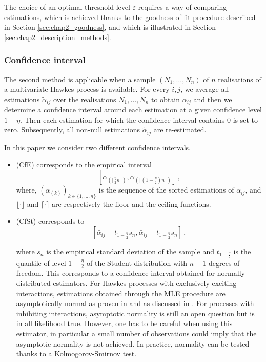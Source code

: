    The choice of an optimal threshold level $\varepsilon$ requires a way of comparing estimations, which is achieved thanks to the goodness-of-fit procedure described in Section \ref{sec:chap2_goodness},
   and which is illustrated in Section \ref{sec:chap2_description_methods}.
   
   \subsubsection{Confidence interval}\label{sec:chap2_confidence_interval}
   
   The second method is applicable when a sample $(N_1, \ldots, N_n)$ of $n$ realisations of a multivariate Hawkes process is available. For every $i,j$, we average all estimations $\tilde\alpha_{ij}$ over the realisations $N_1, \ldots, N_n$ to obtain $\bar\alpha_{ij}$ and then we determine a confidence interval around each estimation at a given confidence level $1-\eta$. Then each estimation for which the confidence interval contains $0$ is set to zero. Subsequently, all non-null estimations $\tilde\alpha_{ij}$ are re-estimated.
   
   In this paper we consider two different confidence intervals. 
   \begin{itemize}
   \item (CfE) corresponds to the empirical interval
   \[
      \left[\alpha_{(\lfloor{\frac{\eta}{2} n}\rfloor)}, \alpha_{(\lceil (1-\frac{\eta}{2}) n \rceil)}\right]\,,
    \]
    where, $(\alpha_{(k)})_{k\in \{1, \ldots, n\}}$ is the sequence of the sorted estimations of $\alpha_{ij}$,
    and $\lfloor \cdot \rfloor$ and $\lceil \cdot \rceil$ are respectively the floor and the ceiling functions.
   \item (CfSt) corresponds to
   \[\left[\bar\alpha_{ij} - t_{1-\frac{\eta}{2}} s_n, \bar\alpha_{ij} + t_{1-\frac{\eta}{2}} s_n \right]\,,\]

   where $s_n$ is the empirical standard deviation of the sample and $t_{1-\frac{\eta}{2}}$ is the quantile of level $1-\frac{\eta}{2}$ of the Student distribution with $n-1$ degrees of freedom. 
   This corresponds to a confidence interval obtained for normally distributed estimators.
   For Hawkes processes with exclusively exciting interactions, estimations obtained through the MLE procedure are asymptotically normal as proven in \cite[Theorem 5]{Ogata1978} and as discussed in \textcite{Laub2014}.
   For processes with inhibiting interactions, 
   asymptotic normality is still an open question but is in all likelihood true.
   However, one has to be careful when using this estimator, in particular a small number of observations could imply that the asymptotic normality is not achieved. In practice, normality can be tested thanks to a Kolmogorov-Smirnov test.   
   
   \end{itemize}
   
